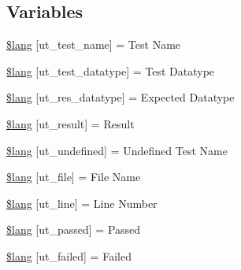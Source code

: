 \subsection*{Variables}
\begin{DoxyCompactItemize}
\item 
\hyperlink{_admin_2system_2language_2english_2unit__test__lang_8php_ad25baa7cab208cbe1fbe6f6913b0e18c}{\$lang} \mbox{[}\textquotesingle{}ut\+\_\+test\+\_\+name\textquotesingle{}\mbox{]} = \textquotesingle{}Test Name\textquotesingle{}
\item 
\hyperlink{_admin_2system_2language_2english_2unit__test__lang_8php_a141cfe44ef46b61362f161bc0cf220bc}{\$lang} \mbox{[}\textquotesingle{}ut\+\_\+test\+\_\+datatype\textquotesingle{}\mbox{]} = \textquotesingle{}Test Datatype\textquotesingle{}
\item 
\hyperlink{_admin_2system_2language_2english_2unit__test__lang_8php_a104083e98991c97a0ffa647a05541146}{\$lang} \mbox{[}\textquotesingle{}ut\+\_\+res\+\_\+datatype\textquotesingle{}\mbox{]} = \textquotesingle{}Expected Datatype\textquotesingle{}
\item 
\hyperlink{_admin_2system_2language_2english_2unit__test__lang_8php_a01f12785712ee32a97dc53d85e226993}{\$lang} \mbox{[}\textquotesingle{}ut\+\_\+result\textquotesingle{}\mbox{]} = \textquotesingle{}Result\textquotesingle{}
\item 
\hyperlink{_admin_2system_2language_2english_2unit__test__lang_8php_a08d38874ed86b9368f126d7597801077}{\$lang} \mbox{[}\textquotesingle{}ut\+\_\+undefined\textquotesingle{}\mbox{]} = \textquotesingle{}Undefined Test Name\textquotesingle{}
\item 
\hyperlink{_admin_2system_2language_2english_2unit__test__lang_8php_aadb1d48c93ccef9a1f4e61d529f8ee80}{\$lang} \mbox{[}\textquotesingle{}ut\+\_\+file\textquotesingle{}\mbox{]} = \textquotesingle{}File Name\textquotesingle{}
\item 
\hyperlink{_admin_2system_2language_2english_2unit__test__lang_8php_aee353ee43b856ce5ec790a20ea15ef92}{\$lang} \mbox{[}\textquotesingle{}ut\+\_\+line\textquotesingle{}\mbox{]} = \textquotesingle{}Line Number\textquotesingle{}
\item 
\hyperlink{_admin_2system_2language_2english_2unit__test__lang_8php_a7b1c16415de1186d294aa317d0bc864f}{\$lang} \mbox{[}\textquotesingle{}ut\+\_\+passed\textquotesingle{}\mbox{]} = \textquotesingle{}Passed\textquotesingle{}
\item 
\hyperlink{_admin_2system_2language_2english_2unit__test__lang_8php_a3aefecf7c98bec69d7957cbb673a3f49}{\$lang} \mbox{[}\textquotesingle{}ut\+\_\+failed\textquotesingle{}\mbox{]} = \textquotesingle{}Failed\textquotesingle{}

\end{DoxyCompactItemize}
